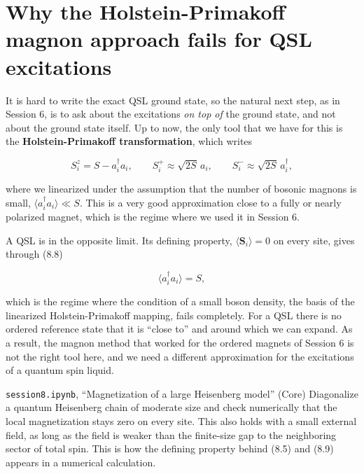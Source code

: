 

\section{Why the Holstein-Primakoff magnon approach fails for QSL excitations}

It is hard to write the exact QSL ground state, so the natural next step, as in Session 6, is to
ask about the excitations \emph{on top of} the ground state, and not about the ground state itself.
Up to now, the only tool that we have for this is the \textbf{Holstein-Primakoff transformation},
which writes

\begin{equation}
S_i^z = S - a_i^\dagger a_i, \qquad S_i^+ \approx \sqrt{2S}\,a_i, \qquad S_i^- \approx
\sqrt{2S}\,a_i^\dagger,
\end{equation}

where we linearized under the assumption that the number of bosonic magnons is small,
$\langle a_i^\dagger a_i\rangle \ll S$. This is a very good approximation close to a fully or
nearly polarized magnet, which is the regime where we used it in Session 6.

A QSL is in the opposite limit. Its defining property, $\langle \mathbf S_i\rangle = 0$ on every
site, gives through (8.8)

\begin{equation}
\langle a_i^\dagger a_i \rangle = S,
\end{equation}

which is the regime where the condition of a small boson density, the basis of the linearized
Holstein-Primakoff mapping, fails completely. For a QSL there is no ordered
reference state that it is ``close to'' and around which we can expand. As a result, the magnon
method that worked for the ordered magnets of Session 6 is not the right tool here, and we need a
different approximation for the excitations of a quantum spin liquid.

\begin{notebookbox}{\texttt{session8.ipynb}, ``Magnetization of a large Heisenberg model'' (Core)}
Diagonalize a quantum Heisenberg chain of moderate size and check numerically that the local
magnetization stays zero on every site. This also holds with a small external field, as long as the
field is weaker than the finite-size gap to the neighboring sector of total spin. This is how the
defining property behind (8.5) and (8.9) appears in a numerical calculation.
\end{notebookbox}

